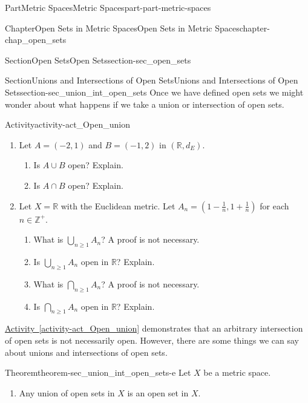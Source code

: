 \documentclass[oneside,10pt,]{book}
\newcommand{\xreffont}{\relax}
\numberwithin{equation}{chapter}
\newcommand{\Z}{\mathbb{Z}}
\newcommand{\R}{\mathbb{R}}
\begin{document}
\begin{partptx}{Part}{Metric Spaces}{}{Metric Spaces}{}{}{part-part-metric-spaces}
\begin{chapterptx}{Chapter}{Open Sets in Metric Spaces}{}{Open Sets in Metric Spaces}{}{}{chapter-chap_open_sets}
\begin{sectionptx}{Section}{Open Sets}{}{Open Sets}{}{}{section-sec_open_sets}
\end{sectionptx}
%
%
\typeout{************************************************}
\typeout{************************************************}
%
\begin{sectionptx}{Section}{Unions and Intersections of Open Sets}{}{Unions and Intersections of Open Sets}{}{}{section-sec_union_int_open_sets}
Once we have defined open sets we might wonder about what happens if we take a union or intersection of open sets.%
\begin{activity}{Activity}{}{activity-act_Open_union}%
\begin{enumerate}[font=\bfseries,label=(\alph*),ref=\alph*]%
\item{}Let \(A = (-2,1)\) and \(B = (-1,2)\) in \((\R, d_E)\).%
\begin{enumerate}[font=\bfseries,label=(\roman*),ref=\theenumi.\roman*]%
\item{}Is \(A \cup B\) open? Explain.%
\item{}Is \(A \cap B\) open? Explain.%
\end{enumerate}%
\item{}Let \(X = \R\) with the Euclidean metric. Let \(A_n = \left(1-\frac{1}{n}, 1+\frac{1}{n}\right)\) for each \(n \in \Z^+\).%
\begin{enumerate}[font=\bfseries,label=(\roman*),ref=\theenumi.\roman*]%
\item{}What is \(\bigcup_{n \geq 1} A_n\)? A proof is not necessary.%
\item{}Is \(\bigcup_{n \geq 1} A_n\) open in \(\R\)? Explain.%
\item{}What is \(\bigcap_{n \geq 1} A_n\)? A proof is not necessary.%
\item{}Is \(\bigcap_{n \geq 1} A_n\) open in \(\R\)? Explain.%
\end{enumerate}%
\end{enumerate}%
\end{activity}%
\hyperref[activity-act_Open_union]{Activity~{\xreffont\ref{activity-act_Open_union}}} demonstrates that an arbitrary intersection of open sets is not necessarily open. However, there are some things we can say about unions and intersections of open sets.%
\begin{theorem}{Theorem}{}{}{theorem-sec_union_int_open_sets-e}%
Let \(X\) be a metric space.%
\begin{enumerate}
\item{}Any union of open sets in \(X\) is an open set in \(X\).%

\end{enumerate}
\end{theorem}
\end{sectionptx}
\end{chapterptx}
\end{partptx}
\end{document}
